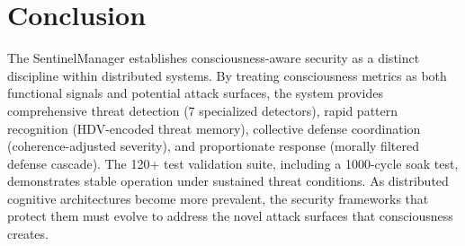 \documentclass[11pt,a4paper]{article}
\begin{document}
\section{Conclusion}

The SentinelManager establishes consciousness-aware security as a distinct discipline within distributed systems. By treating consciousness metrics as both functional signals and potential attack surfaces, the system provides comprehensive threat detection (7 specialized detectors), rapid pattern recognition (HDV-encoded threat memory), collective defense coordination (coherence-adjusted severity), and proportionate response (morally filtered defense cascade). The 120+ test validation suite, including a 1000-cycle soak test, demonstrates stable operation under sustained threat conditions. As distributed cognitive architectures become more prevalent, the security frameworks that protect them must evolve to address the novel attack surfaces that consciousness creates.
\end{document}
